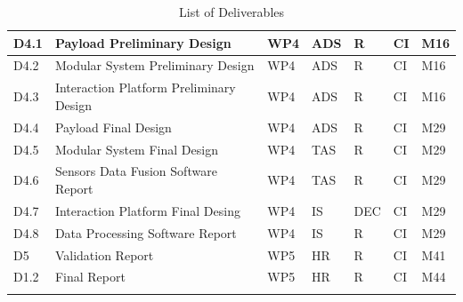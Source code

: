\begin{longtable}[H]{p{1.8cm} >{\raggedright\arraybackslash}p{2.5cm} p{1.3cm} p{1.8cm} p{0.8cm} p{2.1cm} p{1.8cm}}
	\midrule

 	D4.1 & Payload Preliminary Design  & WP4 & ADS & R & CI & M16 \vspace{0.2cm} \\

 	\midrule

	D4.2 & Modular System Preliminary Design & WP4 & ADS & R & CI & M16 \vspace{0.2cm} \\
	
	\midrule
	
	D4.3 & Interaction Platform Preliminary Design  & WP4 & ADS & R & CI & M16 \vspace{0.2cm} \\

	\midrule

 	D4.4 & Payload Final Design & WP4 & ADS & R & CI & M29  \vspace{0.2cm} \\

 	\midrule

	D4.5 & Modular System  Final Design & WP4 & TAS & R & CI & M29  \vspace{0.2cm} \\
	
	\midrule
	
	D4.6 & Sensors Data Fusion Software Report  & WP4 & TAS & R & CI & M29  \vspace{0.2cm} \\

	\midrule

 	D4.7 & Interaction Platform Final Desing  & WP4 & IS & DEC & CI & M29 \vspace{0.2cm} \\

 	\midrule

	D4.8 & Data Processing Software Report & WP4 & IS & R & CI & M29  \vspace{0.2cm} \\
	
	\midrule
	
	D5 & Validation Report & WP5 & HR & R & CI & M41  \vspace{0.2cm} \\

	\midrule

 	D1.2 & Final Report & WP5 & HR & R & CI & M44 \vspace{0.2cm} \\
	
	\bottomrule[2pt]
	
	\caption{List of Deliverables}
	\label{Deliverables}
\end{longtable}

